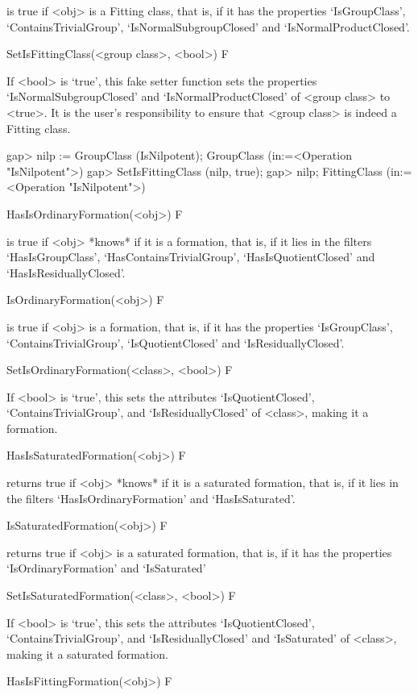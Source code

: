 is true if <obj> is a Fitting class, that is, if it has the properties
`IsGroupClass', `ContainsTrivialGroup', `IsNormalSubgroupClosed' and
`IsNormalProductClosed'.

\>SetIsFittingClass(<group class>, <bool>) F

If <bool> is `true', this fake setter function sets the properties
`IsNormalSubgroupClosed' and `IsNormalProductClosed' of <group class> to
<true>. It is the user's responsibility  to ensure that <group class> is
indeed a Fitting class.

\beginexample
gap> nilp := GroupClass (IsNilpotent);
GroupClass (in:=<Operation "IsNilpotent">)
gap> SetIsFittingClass (nilp, true);
gap> nilp;
FittingClass (in:=<Operation "IsNilpotent">)
\endexample

\>HasIsOrdinaryFormation(<obj>) F

\relax
is true if <obj> *knows* if it is a formation, that is, if it lies in the filters
`HasIsGroupClass', `HasContainsTrivialGroup', `HasIsQuotientClosed' and 
`HasIsResiduallyClosed'.

\>IsOrdinaryFormation(<obj>) F

\relax
is true if <obj> is a formation, that is, if it has the properties
`IsGroupClass', `ContainsTrivialGroup', `IsQuotientClosed' and `IsResiduallyClosed'.

\>SetIsOrdinaryFormation(<class>, <bool>) F

\relax
If <bool> is `true', this sets the attributes `IsQuotientClosed',
`ContainsTrivialGroup', and `IsResiduallyClosed' of <class>, making it a formation.

\>HasIsSaturatedFormation(<obj>) F

returns true if <obj> *knows* if it is a saturated formation, that is, if it
lies in the filters `HasIsOrdinaryFormation' and `HasIsSaturated'.

\>IsSaturatedFormation(<obj>) F

returns true if <obj> is a saturated formation, that is, if it has the
properties `IsOrdinaryFormation' and `IsSaturated'

\>SetIsSaturatedFormation(<class>, <bool>) F

If <bool> is `true', this sets the attributes `IsQuotientClosed',
`ContainsTrivialGroup', and `IsResiduallyClosed' and `IsSaturated'
of <class>, making it a saturated formation.

\>HasIsFittingFormation(<obj>) F

